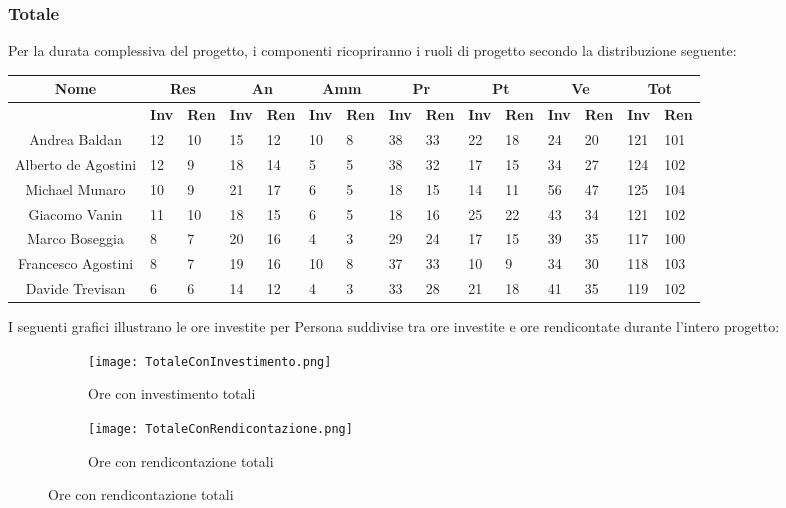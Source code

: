 \documentclass{scalatekids-article}
\begin{document}
\subsubsection{Totale}
Per la durata complessiva del progetto, i componenti ricopriranno i ruoli di progetto secondo la distribuzione seguente:
\begin{center}
  \scriptsize
  \begin{tabular}{| c | p{0.35cm}  p{0.35cm} | p{0.35cm}  p{0.35cm} | p{0.35cm}  p{0.35cm} | p{0.35cm}  p{0.35cm} | p{0.35cm}  p{0.35cm} | p{0.35cm}  p{0.35cm} | p{0.35cm}  p{0.35cm} |}
    \hline
    \textbf{Nome} & \multicolumn{2}{|c|}{\textbf{Res}} & \multicolumn{2}{|c|}{\textbf{An}} & \multicolumn{2}{|c|}{\textbf{Amm}} & \multicolumn{2}{|c|}{\textbf{Pr}} & \multicolumn{2}{|c|}{\textbf{Pt}} & \multicolumn{2}{|c|}{\textbf{Ve}} & \multicolumn{2}{|c|}{\textbf{Tot}}\\
    \hline
    & \textbf{Inv} & \textbf{Ren} & \textbf{Inv} & \textbf{Ren} & \textbf{Inv} & \textbf{Ren} & \textbf{Inv} & \textbf{Ren} & \textbf{Inv} & \textbf{Ren} & \textbf{Inv} & \textbf{Ren} & \textbf{Inv} & \textbf{Ren}\\
    \hline
    Andrea Baldan & 12 & 10 & 15 & 12 & 10 & 8 & 38 & 33 & 22 & 18 & 24 & 20 & 121 & 101\\
    Alberto de Agostini & 12 & 9 & 18 & 14 & 5 & 5 & 38 & 32 & 17 & 15 & 34 & 27 & 124 & 102\\
    Michael Munaro & 10 & 9 & 21 & 17 & 6 & 5 & 18 & 15 & 14 & 11 & 56 & 47 & 125 & 104\\
    Giacomo Vanin & 11 & 10 & 18 & 15 & 6 & 5 & 18 & 16 & 25 & 22 & 43 & 34 & 121 & 102\\
    Marco Boseggia & 8 & 7 & 20 & 16 & 4 & 3 & 29 & 24 & 17 & 15 & 39 & 35 & 117 & 100\\
    Francesco Agostini & 8 & 7 & 19 & 16 & 10 & 8 & 37 & 33 & 10 & 9 & 34 & 30 & 118 & 103\\
    Davide Trevisan & 6 & 6 & 14 & 12 & 4 & 3 & 33 & 28 & 21 & 18 & 41 & 35 & 119 & 102\\
    \hline
  \end{tabular}
\end{center}
\normalsize
I seguenti grafici illustrano le ore investite per Persona suddivise tra ore investite e ore rendicontate durante l'intero progetto:
\begin{figure}[H]
  \begin{subfigure}[H]{0.47\textwidth}
    \texttt{[image: TotaleConInvestimento.png]}
    \caption*{Ore con investimento totali}
  \end{subfigure}
  \qquad
  \begin{subfigure}[H]{0.47\textwidth}
    \texttt{[image: TotaleConRendicontazione.png]}
    \caption*{Ore con rendicontazione totali}
  \end{subfigure}
\end{figure}
\end{document}
